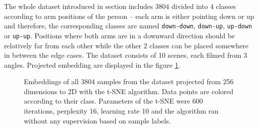 The whole  dataset introduced in section  includes 3804 divided into 4 classes according to arm positions of the person -- each arm is either pointing down or up and therefore, the corresponding classes are named \texttt{down-down}, \texttt{down-up}, \texttt{up-down} or \texttt{up-up}. Positions where both arms are in a downward direction should be relatively far from each other while the other 2 classes can be placed somewhere in between the edge cases. The dataset consists of 10 scenes, each filmed from 3 angles. Projected embedding are displayed in the figure \ref{fig:t-sne}.

\begin{figure}[!ht]
    \centering
    \caption{Embeddings of all 3804 samples from the  dataset projected from 256 dimensions to 2D with the t-SNE algorithm. Data points are colored according to their class. Parameters of the t-SNE were 600 iterations, perplexity 16, learning rate 10 and the algorithm ran without any supervision based on sample labels.}
    \label{fig:t-sne}
\end{figure}

